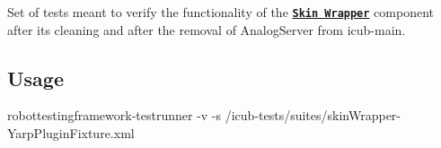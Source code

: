 Set of tests meant to verify the functionality of the \href{http://wiki.icub.org/iCub/main/dox/html/classskinWrapper.html}{\tt {\bfseries Skin Wrapper}} component after its cleaning and after the removal of Analog\+Server from icub-\/main.

\subsection*{Usage }

{\ttfamily robottestingframework-\/testrunner -\/v -\/s /icub-\/tests/suites/skin\+Wrapper-\/\+Yarp\+Plugin\+Fixture.xml} 